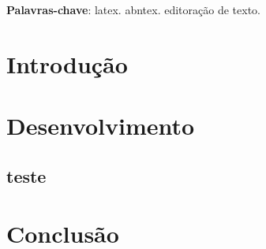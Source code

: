 \documentclass[12pt,openany,oneside,a4paper,brazil]{abntex2}
\renewcommand{\imprimircapa}{%
  \begin{capa}%
    \center
    {\ABNTEXchapterfont\large\imprimirinstituicao} %
    
    \vspace*{\fill}
    
    {\ABNTEXchapterfont\large\imprimirautor}
    
    \vspace*{\fill}
    \begin{center}
    \ABNTEXchapterfont\bfseries\LARGE\imprimirtitulo
    \end{center}
    \vspace*{\fill}
    
    {\large\imprimirlocal}
    \par
    {\large\imprimirdata}
    \vspace*{1cm}
  \end{capa}
}
\begin{document}
\pretextual
\imprimircapa
\imprimirfolhaderosto
\newpage
\tableofcontents*
\imprimirorientadorRotulo
\begin{resumo}
\vspace{\onelineskip}
\noindent
\textbf{Palavras-chave}: latex. abntex. editoração de texto.
\end{resumo}

\textual

\chapter{Introdução}

\chapter{Desenvolvimento}
\section{teste}

\chapter{Conclusão}
\postextual
\end{document}
